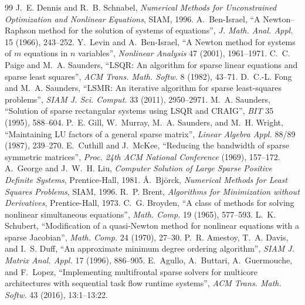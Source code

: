 \documentclass[11pt]{article}
\begin{document}
\begin{thebibliography}{99}
 J.~E. Dennis and R.~B. Schnabel, \emph{Numerical Methods for Unconstrained
Optimization and Nonlinear Equations}, SIAM, 1996.
 A.~Ben-Israel, ``A Newton--Raphson method for the solution of systems of
equations'', \emph{J. Math. Anal. Appl.} 15 (1966), 243--252.
 Y.~Levin and A.~Ben-Israel, ``A Newton method for systems of $m$ equations in
$n$ variables'', \emph{Nonlinear Analysis} 47 (2001), 1961--1971.
 C.~C. Paige and M.~A. Saunders, ``LSQR: An algorithm for sparse linear equations and
sparse least squares'', \emph{ACM Trans. Math. Softw.} 8 (1982), 43--71.
 D.~C.-L. Fong and M.~A. Saunders, ``LSMR: An iterative algorithm for sparse
least-squares problems'', \emph{SIAM J. Sci. Comput.} 33 (2011), 2950--2971.
 M.~A. Saunders, ``Solution of sparse rectangular systems using LSQR and CRAIG'',
\emph{BIT} 35 (1995), 588--604.
 P.~E. Gill, W.~Murray, M.~A. Saunders, and M.~H. Wright, ``Maintaining LU factors of a
general sparse matrix'', \emph{Linear Algebra Appl.} 88/89 (1987), 239--270.
 E.~Cuthill and J.~McKee, ``Reducing the bandwidth of sparse symmetric
matrices'', \emph{Proc. 24th ACM National Conference} (1969), 157--172.
 A.~George and J.~W.~H. Liu, \emph{Computer Solution of Large Sparse Positive
Definite Systems}, Prentice-Hall, 1981.
 \AA.~Bj\"orck, \emph{Numerical Methods for Least Squares Problems}, SIAM, 1996.
 R.~P. Brent, \emph{Algorithms for Minimization without Derivatives}, Prentice-Hall, 1973.
 C.~G. Broyden, ``A class of methods for solving nonlinear simultaneous equations'',
\emph{Math. Comp.} 19 (1965), 577--593.
 L.~K. Schubert, ``Modification of a quasi-Newton method for nonlinear equations with
a sparse Jacobian'', \emph{Math. Comp.} 24 (1970), 27--30.
 P.~R. Amestoy, T.~A. Davis, and I.~S. Duff, ``An approximate minimum degree ordering
algorithm'', \emph{SIAM J. Matrix Anal. Appl.} 17 (1996), 886--905.
 E.~Agullo, A.~Buttari, A.~Guermouche, and F.~Lopez, ``Implementing multifrontal sparse
solvers for multicore architectures with sequential task flow runtime systems'', \emph{ACM Trans. Math.
Softw.} 43 (2016), 13:1--13:22.
\end{thebibliography}
\end{document}
